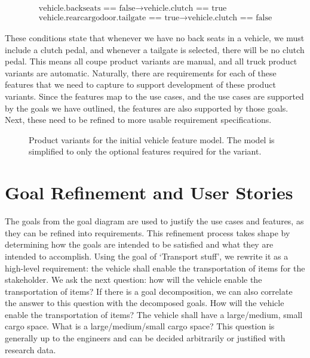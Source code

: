 \begin{gather}
	\text{vehicle.backseats == false} \rightarrow \text{vehicle.clutch == true}\\
	\text{vehicle.rearcargodoor.tailgate == true} \rightarrow \text{vehicle.clutch == false}
\end{gather}

These conditions state that whenever we have no back seats in a vehicle, we must include a clutch pedal, and whenever a tailgate is selected, there will be no clutch pedal. This means all coupe product variants are manual, and all truck product variants are automatic. Naturally, there are requirements for each of these features that we need to capture to support development of these product variants. Since the features map to the use cases, and the use cases are supported by the goals we have outlined, the features are also supported by those goals. Next, these need to be refined to more usable requirement specifications.

\begin{figure}
	\centering
	
	\caption{Product variants for the initial vehicle feature model. The model is simplified to only the optional features required for the variant.}
	\label{fig:veh_variants}
\end{figure}

\section{Goal Refinement and User Stories}

The goals from the goal diagram are used to justify the use cases and features, as they can be refined into requirements. This refinement process takes shape by determining how the goals are intended to be satisfied and what they are intended to accomplish. Using the goal of `Transport stuff', we rewrite it as a high-level requirement: the vehicle shall enable the transportation of items for the stakeholder. We ask the next question: how will the vehicle enable the transportation of items? If there is a goal decomposition, we can also correlate the answer to this question with the decomposed goals. How will the vehicle enable the transportation of items? The vehicle shall have a large/medium, small cargo space. What is a large/medium/small cargo space? This question is generally up to the engineers and can be decided arbitrarily or justified with research data. 



